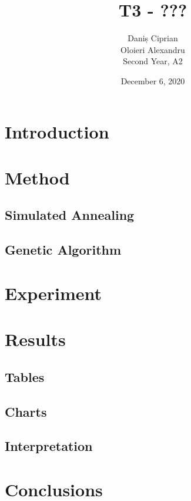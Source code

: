 \documentclass[a4paper]{article}
\title{T3 - ???}
\author{Daniș Ciprian\\
	Oloieri Alexandru \\
	Second Year, A2}
\date{December 6, 2020}
\begin{document}
\maketitle
\section{Introduction}

\section{Method}

\subsection{Simulated Annealing}

\subsection{Genetic Algorithm}

\section{Experiment}

\section{Results}

\subsection{Tables}

\subsection{Charts}

\subsection{Interpretation}

\section{Conclusions}

\begin{thebibliography}{9}

	\end{thebibliography}
\end{document}
